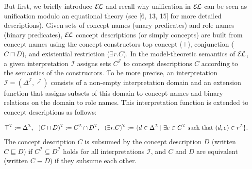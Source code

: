  
 
But first, we briefly introduce $\mathcal{E\mkern-1.618muL}$ and recall why unification in $\mathcal{E\mkern-1.618muL}$ can be seen as unification modulo an equational theory (see [6, 13, 15] for more detailed descriptions). Given sets of concept names (unary predicates) and role names (binary predicates), $\mathcal{E\mkern-1.618muL}$ concept descriptions (or simply concepts) are built from concept names using the concept constructors top concept ($\top$), conjunction ($C\sqcap D$), and existential restriction ($\exists r.C$). In the model-theoretic semantics of $\mathcal{E\mkern-1.618muL}$, a given interpretation $\mathcal{I}$ assigns sets $C^{\mathcal{I}}$ to concept descriptions $C$ according to the semantics of the constructors. To be more precise, an interpretation $\mathcal{I}=(\Delta^{\mathcal{I}},\cdot^{\mathcal{I}})$ consists of a non-empty interpretation domain and an extension function that assigns subsets of this domain to concept names and binary relations on the domain to role names. This interpretation function is extended to concept descriptions as follows:\par
    \[\top^{\mathcal{I}}:=\Delta^{\mathcal{I}},\ \ (C\sqcap D)^{\mathcal{I}}:=C^{%
\mathcal{I}}\cap D^{\mathcal{I}},\ \ (\exists r.C)^{\mathcal{I}}:=\{d\in\Delta%
^{\mathcal{I}}\mid\exists e\in C^{\mathcal{I}}\ \mbox{such that}\ (d,e)\in r^{%
\mathcal{I}}\}.\]    
The concept description $C$ is subsumed by the concept description $D$ (written $C\sqsubseteq D$) if $C^{\mathcal{I}}\subseteq D^{\mathcal{I}}$ holds for all interpretations $\mathcal{I}$, and $C$ and $D$ are equivalent (written $C\equiv D$) if they subsume each other.\par
 
 
 
